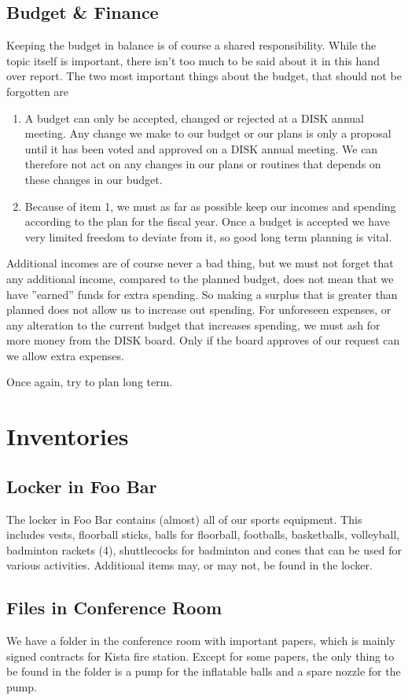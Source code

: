 \documentclass[12pt,a4paper]{article}
\begin{document}
		\subsection{Budget \& Finance}
			Keeping the budget in balance is of course a shared responsibility. While the topic itself is important, there isn't too much to be said about it in this hand over report. The two most important things about the budget, that should not be forgotten are
			\begin{enumerate}
				\item A budget can only be accepted, changed or rejected at a DISK annual meeting. Any change we make to our budget or our plans is only a proposal until it has been voted and approved on a DISK annual meeting. We can therefore not act on any changes in our plans or routines that depends on these changes in our budget.
				\item Because of item 1, we must as far as possible keep our incomes and spending according to the plan for the fiscal year. Once a budget is accepted we have very limited freedom to deviate from it, so good long term planning is vital.
			\end{enumerate}

			Additional incomes are of course never a bad thing, but we must not forget that any additional income, compared to the planned budget, does not mean that we have ''earned'' funds for extra spending. So making a surplus that is greater than planned does not allow us to increase out spending. For unforeseen expenses, or any alteration to the current budget that increases spending, we must ash for more money from the DISK board. Only if the board approves of our request can we allow extra expenses.

			Once again, try to plan long term.

	\section{Inventories}
		\subsection{Locker in Foo Bar}
			The locker in Foo Bar contains (almost) all of our sports equipment. This includes vests, floorball sticks, balls for floorball, footballs, basketballs, volleyball, badminton rackets (4), shuttlecocks for badminton and cones that can be used for various activities. Additional items may, or may not, be found in the locker.
		\subsection{Files in Conference Room}
			We have a folder in the conference room with important papers, which is mainly signed contracts for Kista fire station. Except for some papers, the only thing to be found in the folder is a pump for the inflatable balls and a spare nozzle for the pump.
\end{document}
